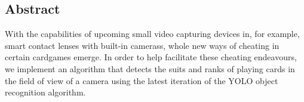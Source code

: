 \documentclass[a0,landscape]{a0poster}
\begin{document}
\vspace{1cm} %


\begin{multicols}{3} %


\color{Navy} %

\centering\section*{Abstract}
\raggedright	
\Large
With the capabilities of upcoming small video capturing devices in, for example, smart contact lenses with built-in camerass, whole new ways of cheating in certain cardgames emerge. In order to help facilitate these cheating endeavours, we implement an algorithm that detects the suits and ranks of playing cards in the field of view of a camera using the latest iteration of the YOLO object recognition algorithm.


\color{DarkSlateGray} %


\large




\end{multicols}
\end{document}
